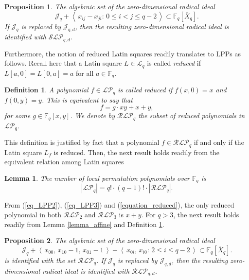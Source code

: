 \documentclass[pdflatex,sn-mathphys-num]{sn-jnl}
\theoremstyle{thmstyleone}%
\newtheorem{proposition}{Proposition}[section]
\newtheorem{lemma}{Lemma}[section]
\newtheorem{definition}{Definition}[section]
\begin{document}
\begin{proposition}\label{proposition_symmetric}
The algebraic set of the zero-dimensional radical ideal
\[\mathcal{J}_q + \left\langle\,x_{ij}-x_{ji}\colon\, 0\leq i<j\leq q-2\,\right\rangle\subset \mathbb{F}_q[\overline{X}_q].\]
If $\mathcal{J}_q$ is replaced by $\mathcal{J}_{q,d}$, then the resulting zero-dimensional radical ideal is identified with $\mathcal{SLP}_{q,d}$. 
\end{proposition}

\vspace{0.2cm}

Furthermore, the notion of reduced Latin squares readily translates to LPPs as follows. Recall here that a Latin square $L\in\mathcal{L}_q$ is called {\em reduced} if $L[a,0]=L[0,a]=a$ for all $a\in \mathbb{F}_q$. 

\begin{definition}\label{def:reduced} A polynomial $f\in \mathcal{LP}_q$ is called {\em reduced} if $f(x,0)=x$ and $f(0,y)=y$. This is equivalent to say that 
\begin{equation}\label{equation_reduced}
f=g\cdot xy + x + y,
\end{equation}
for some $g\in\mathbb{F}_q[x,y]$. We denote by $\mathcal{RLP}_q$ the subset of reduced polynomials in $\mathcal{LP}_q$.
\end{definition}

\vspace{0.2cm}

This definition is justified by fact that a polynomial $f\in \mathcal{RLP}_q$ if and only if the Latin square $L_f$ is reduced. Then, the next result holds readily from the equivalent relation among Latin squares

\begin{lemma} The number of local permutation polynomials over $\mathbb{F}_q$ is
\[|\mathcal{LP}_q|=q!\cdot (q-1)!\cdot |\mathcal{RLP}_q|.\]
\end{lemma}

\vspace{0.2cm}

From (\ref{eq_LPP2}), (\ref{eq_LPP3}) and (\ref{equation_reduced}), the only reduced polynomial in both $\mathcal{RLP}_2$ and $\mathcal{RLP}_3$ is $x+y$. For $q>3$, the next result holds readily from Lemma \ref{lemma_affine} and Definition \ref{def:reduced}.

\begin{proposition}\label{proposition_reduced} 
The algebraic set of the zero-dimensional radical ideal 
\[\mathcal{J}_q + \left\langle\,x_{00},\,x_{10}-1,\,x_{01}-1\,\right\rangle+\left\langle\,x_{0i},\,x_{i0}\colon\, 2\leq i\leq q-2\,\right\rangle\subset \mathbb{F}_q[\overline{X}_q].\]
is identified with the set $\mathcal{RLP}_q$. If $\mathcal{J}_q$ is replaced by $\mathcal{J}_{q,d}$, then the resulting zero-dimensional radical ideal is identified with $\mathcal{RLP}_{q,d}$. 
\end{proposition}
\end{document}
